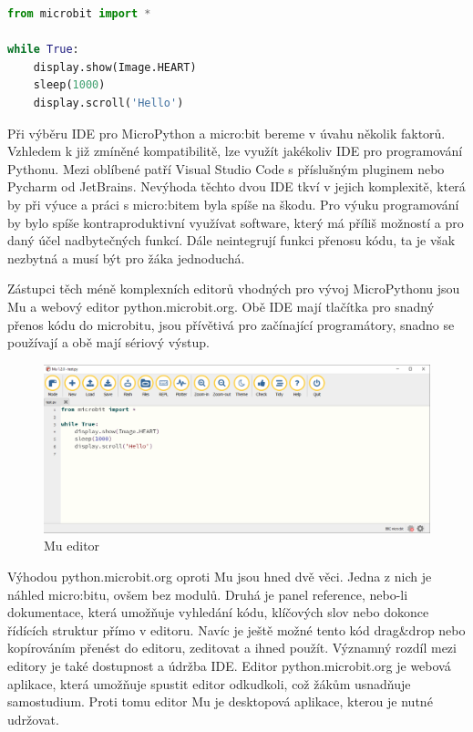 \documentclass[
  digital,     %
  oneside,     %
  nosansbold,  %
  colorbold, %
  lof,         %
  nolot,         %
]{fithesis4}
\begin{document}
\begin{lstlisting}[language=Python, caption={MicroPython ukázka}, label={ukazkaMicroPython}]
from microbit import *

while True:
    display.show(Image.HEART)
    sleep(1000)
    display.scroll('Hello')
\end{lstlisting}

Při výběru IDE pro MicroPython a micro:bit bereme v úvahu několik faktorů. 
Vzhledem k již zmíněné kompatibilitě, lze využít jakékoliv IDE pro programování Pythonu. Mezi oblíbené patří Visual Studio Code s příslušným pluginem nebo Pycharm od JetBrains. Nevýhoda těchto dvou IDE tkví v jejich komplexitě, která by při výuce a práci s micro:bitem byla spíše na škodu. Pro výuku programování by bylo spíše kontraproduktivní využívat software, který má příliš možností a pro daný účel nadbytečných funkcí. Dále neintegrují funkci přenosu kódu, ta je však nezbytná a musí být pro žáka jednoduchá.

Zástupci těch méně komplexních editorů vhodných pro vývoj MicroPythonu jsou Mu a webový editor python.microbit.org. Obě IDE mají tlačítka pro snadný přenos kódu do microbitu, jsou přívětivá pro začínající programátory, snadno se používají a obě mají sériový výstup. 

\begin{figure}
    \centering
    \includegraphics[width=\textwidth]  {images/mu.png}
    \caption{Mu editor}
    \label{MuED}
\end{figure}

Výhodou python.microbit.org oproti Mu jsou hned dvě věci. Jedna z nich je náhled micro:bitu, ovšem bez modulů. Druhá je panel reference, nebo-li dokumentace, která umožňuje vyhledání kódu, klíčových slov nebo dokonce řídících struktur přímo v editoru. Navíc je ještě možné tento kód drag\&drop nebo kopírováním přenést do editoru, zeditovat a ihned použít. Významný rozdíl mezi editory je také dostupnost a údržba IDE. Editor python.microbit.org je webová aplikace, která umožňuje spustit editor odkudkoli, což žákům usnadňuje samostudium. Proti tomu editor Mu je desktopová aplikace, kterou je nutné udržovat.
\end{document}
